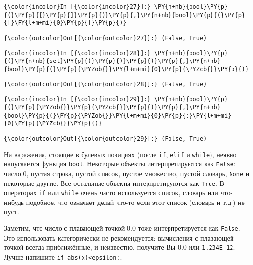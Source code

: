     \begin{Verbatim}[commandchars=\\\{\}]
{\color{incolor}In [{\color{incolor}27}]:} \PY{n+nb}{bool}\PY{p}{(}\PY{p}{[}\PY{p}{]}\PY{p}{)}\PY{p}{,}\PY{n+nb}{bool}\PY{p}{(}\PY{p}{[}\PY{l+m+mi}{0}\PY{p}{]}\PY{p}{)}
\end{Verbatim}

            \begin{Verbatim}[commandchars=\\\{\}]
{\color{outcolor}Out[{\color{outcolor}27}]:} (False, True)
\end{Verbatim}
        
    \begin{Verbatim}[commandchars=\\\{\}]
{\color{incolor}In [{\color{incolor}28}]:} \PY{n+nb}{bool}\PY{p}{(}\PY{n+nb}{set}\PY{p}{(}\PY{p}{)}\PY{p}{)}\PY{p}{,}\PY{n+nb}{bool}\PY{p}{(}\PY{p}{\PYZob{}}\PY{l+m+mi}{0}\PY{p}{\PYZcb{}}\PY{p}{)}
\end{Verbatim}

            \begin{Verbatim}[commandchars=\\\{\}]
{\color{outcolor}Out[{\color{outcolor}28}]:} (False, True)
\end{Verbatim}
        
    \begin{Verbatim}[commandchars=\\\{\}]
{\color{incolor}In [{\color{incolor}29}]:} \PY{n+nb}{bool}\PY{p}{(}\PY{p}{\PYZob{}}\PY{p}{\PYZcb{}}\PY{p}{)}\PY{p}{,}\PY{n+nb}{bool}\PY{p}{(}\PY{p}{\PYZob{}}\PY{l+m+mi}{0}\PY{p}{:}\PY{l+m+mi}{0}\PY{p}{\PYZcb{}}\PY{p}{)}
\end{Verbatim}

            \begin{Verbatim}[commandchars=\\\{\}]
{\color{outcolor}Out[{\color{outcolor}29}]:} (False, True)
\end{Verbatim}
        
    На варажения, стоящие в булевых позициях (после \texttt{if},
\texttt{elif} и \texttt{while}), неявно напускается функция
\texttt{bool}. Некоторые объекты интерпретируются как \texttt{False}:
число 0, пустая строка, пустой список, пустое множество, пустой словарь,
\texttt{None} и некоторые другие. Все остальные объекты интерпретируются
как \texttt{True}. В операторах \texttt{if} или \texttt{while} очень
часто используется список, словарь или что-нибудь подобное, что означает
делай что-то если этот список (словарь и т.д.) не пуст.

Заметим, что число с плавающей точкой 0.0 тоже интерпретируется как
\texttt{False}. Это использовать категорически не рекомендуется:
вычисления с плавающей точкой всегда приближённые, и неизвестно,
получите Вы 0.0 или \texttt{1.234E-12}. Лучше напишите
\texttt{if\ abs(x)\textless{}epsilon:}.
